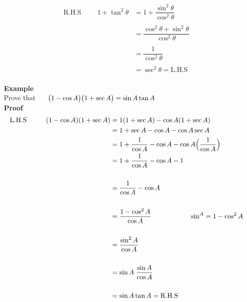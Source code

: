 \documentclass[11pt,a4paper]{article}
\begin{document}
\begin{align*}
\text{R.H.S}\hspace{1cm} 1 + \tan^2\theta & = 1 + \dfrac{\sin^2\theta}{\cos^2\theta}\\\\
& = \dfrac{\cos^2\theta + \sin^2\theta}{\cos^2\theta}\\\\
& = \dfrac{1}{\cos^2\theta}\\\\
& = \sec^2\theta = \text{L.H.S}\\
\end{align*}









\textbf{Example}\\
Prove that $\hspace{0.5cm} \big( 1 - \cos A\big)\big(1 + \sec A\big) = \sin A \tan A$\\

\textbf{Proof}
\begin{align*}
\text{L.H.S}\hspace{1cm} (1 - \cos A)(1 + \sec A) & = 1 (1 + \sec A) - \cos A (1 + \sec A)\\
& = 1 + \sec A - \cos A - \cos A\sec A\\
& = 1 + \dfrac{1}{\cos A} - \cos A - \cos A\Big(\dfrac{1}{\cos A}\Big)\\
& = 1 + \dfrac{1}{\cos A} - \cos A - 1\\\\
& = \dfrac{1}{\cos A}-\cos A\\\\
& = \dfrac{1 - \cos^2 A}{\cos A}\hspace{2cm} \sin^A = 1 - \cos^2A\\\\
& = \dfrac{\sin^2A}{\cos A}\\\\
& = \sin A\hspace{0.1cm}\dfrac{\sin A}{\cos A}\\\\
& = \sin A \tan A = \text{R.H.S}\\\\
\end{align*}
\end{document}
